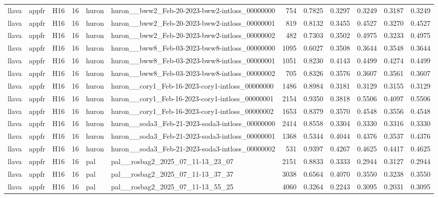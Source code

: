 \begin{table}[tbp]
\begin{tabular}{lllrllrrrrrr}
llava & appfr & H16 & 16 & huron & huron\_\_bww2\_Feb-20-2023-bww2-intloss\_00000000 & 754 & 0.7825 & 0.3297 & 0.3249 & 0.3187 & 0.3249 \\
llava & appfr & H16 & 16 & huron & huron\_\_bww2\_Feb-20-2023-bww2-intloss\_00000001 & 819 & 0.8132 & 0.3455 & 0.4527 & 0.3270 & 0.4527 \\
llava & appfr & H16 & 16 & huron & huron\_\_bww2\_Feb-20-2023-bww2-intloss\_00000002 & 482 & 0.7303 & 0.3502 & 0.4975 & 0.3233 & 0.4975 \\
llava & appfr & H16 & 16 & huron & huron\_\_bww8\_Feb-03-2023-bww8-intloss\_00000000 & 1095 & 0.6027 & 0.3508 & 0.3644 & 0.3548 & 0.3644 \\
llava & appfr & H16 & 16 & huron & huron\_\_bww8\_Feb-03-2023-bww8-intloss\_00000001 & 1051 & 0.8230 & 0.4143 & 0.4499 & 0.4274 & 0.4499 \\
llava & appfr & H16 & 16 & huron & huron\_\_bww8\_Feb-03-2023-bww8-intloss\_00000002 & 705 & 0.8326 & 0.3576 & 0.3607 & 0.3561 & 0.3607 \\
llava & appfr & H16 & 16 & huron & huron\_\_cory1\_Feb-16-2023-cory1-intloss\_00000000 & 1486 & 0.8984 & 0.3181 & 0.3129 & 0.3155 & 0.3129 \\
llava & appfr & H16 & 16 & huron & huron\_\_cory1\_Feb-16-2023-cory1-intloss\_00000001 & 2154 & 0.9350 & 0.3818 & 0.5506 & 0.4097 & 0.5506 \\
llava & appfr & H16 & 16 & huron & huron\_\_cory1\_Feb-16-2023-cory1-intloss\_00000002 & 1653 & 0.8379 & 0.3570 & 0.4548 & 0.3556 & 0.4548 \\
llava & appfr & H16 & 16 & huron & huron\_\_soda3\_Feb-21-2023-soda3-intloss\_00000000 & 2414 & 0.8558 & 0.3304 & 0.3330 & 0.3316 & 0.3330 \\
llava & appfr & H16 & 16 & huron & huron\_\_soda3\_Feb-21-2023-soda3-intloss\_00000001 & 1368 & 0.5344 & 0.4044 & 0.4376 & 0.3537 & 0.4376 \\
llava & appfr & H16 & 16 & huron & huron\_\_soda3\_Feb-21-2023-soda3-intloss\_00000002 & 531 & 0.9397 & 0.4267 & 0.4625 & 0.4417 & 0.4625 \\
llava & appfr & H16 & 16 & pal & pal\_\_rosbag2\_2025\_07\_11-13\_23\_07 & 2151 & 0.8833 & 0.3333 & 0.2944 & 0.3127 & 0.2944 \\
llava & appfr & H16 & 16 & pal & pal\_\_rosbag2\_2025\_07\_11-13\_37\_37 & 3038 & 0.6564 & 0.4070 & 0.3550 & 0.3238 & 0.3550 \\
llava & appfr & H16 & 16 & pal & pal\_\_rosbag2\_2025\_07\_11-13\_55\_25 & 4060 & 0.3264 & 0.2243 & 0.3095 & 0.2031 & 0.3095 \\

\end{tabular}
\end{table}
